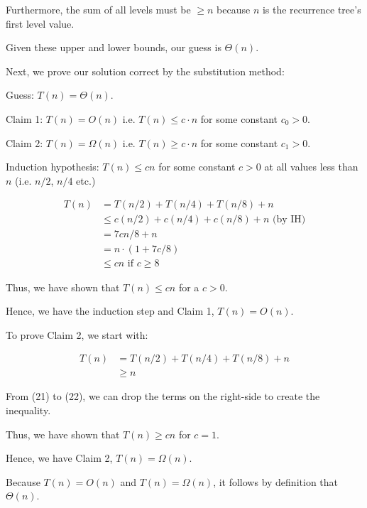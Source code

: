\documentclass[a4paper]{report}
\begin{document}
\begin{enumerate}
      Furthermore, the sum of all levels must be $\geq n$ because $n$ is the recurrence tree's first level value. 

      Given these upper and lower bounds, our guess is $\Theta(n)$.

      Next, we prove our solution correct by the substitution method:

      Guess: $T(n) = \Theta(n)$.

      Claim 1: $T(n) = O(n)$ i.e. $T(n) \leq c \cdot n$ for some constant $c_{0}>0$.

      Claim 2: $T(n) = \Omega(n)$ i.e. $T(n) \geq c \cdot n$ for some constant $c_{1}>0$.

      Induction hypothesis: $T(n) \leq cn$ for some constant $c>0$ at all values less than $n$ (i.e. $n/2$, $n/4$ etc.)

      \begin{align}
        T(n) &= T(n/2) + T(n/4) + T(n/8) + n \\
        &\leq c(n/2)+ c(n/4) + c(n/8) + n\text{         (by IH)}\\
        &= 7cn / 8 + n \\
        &= n \cdot (1 + 7c/8) \\
        &\leq cn \text{    if $c\geq8$}
      \end{align}

      Thus, we have shown that $T(n) \leq cn$ for a $c>0$.

      Hence, we have the induction step and Claim 1, $T(n) = O(n)$. 

      To prove Claim 2, we start with:

      \begin{align}
        T(n) &= T(n/2) + T(n/4) + T(n/8) + n \\
        &\geq n
      \end{align}

      From (21) to (22), we can drop the terms on the right-side to create the inequality. 

      Thus, we have shown that $T(n) \geq cn$ for $c=1$.

      Hence, we have Claim 2, $T(n) = \Omega(n)$.

      Because $T(n) = O(n)$ and $T(n) = \Omega(n)$, it follows by definition that $\Theta(n)$.



  \end{enumerate}
\end{document}
